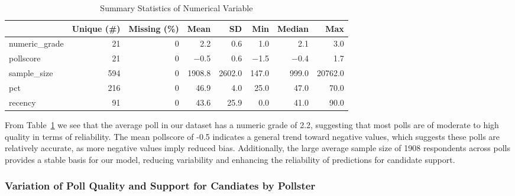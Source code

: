 \documentclass[
  letterpaper,
  DIV=11,
  numbers=noendperiod]{scrartcl}
\begin{document}
\newpage

\hypertarget{tbl-sumstat}{}
\begin{table}
\caption{\label{tbl-sumstat}Summary Statistics of Numerical Variable }\tabularnewline

\centering
\begin{tabular}[t]{lrrrrrrr}
\toprule
  & Unique (\#) & Missing (\%) & Mean & SD & Min & Median & Max\\
\midrule
numeric\_grade & 21 & 0 & \num{2.2} & \num{0.6} & \num{1.0} & \num{2.1} & \num{3.0}\\
pollscore & 21 & 0 & \num{-0.5} & \num{0.6} & \num{-1.5} & \num{-0.4} & \num{1.7}\\
sample\_size & 594 & 0 & \num{1908.8} & \num{2602.0} & \num{147.0} & \num{999.0} & \num{20762.0}\\
pct & 216 & 0 & \num{46.9} & \num{4.0} & \num{25.0} & \num{47.0} & \num{70.0}\\
recency & 91 & 0 & \num{43.6} & \num{25.9} & \num{0.0} & \num{41.0} & \num{90.0}\\
\bottomrule
\end{tabular}
\end{table}

\vspace{0.7cm}

From Table~\ref{tbl-sumstat} we see that the average poll in our dataset
has a numeric grade of 2.2, suggesting that most polls are of moderate
to high quality in terms of reliability. The mean pollscore of -0.5
indicates a general trend toward negative values, which suggests these
polls are relatively accurate, as more negative values imply reduced
bias. Additionally, the large average sample size of 1908 respondents
across polls provides a stable basis for our model, reducing variability
and enhancing the reliability of predictions for candidate support.

\newpage

\hypertarget{variation-of-poll-quality-and-support-for-candiates-by-pollster}{%
\subsubsection{Variation of Poll Quality and Support for Candiates by
Pollster}\label{variation-of-poll-quality-and-support-for-candiates-by-pollster}}

\vspace{0.7cm}
\end{document}
